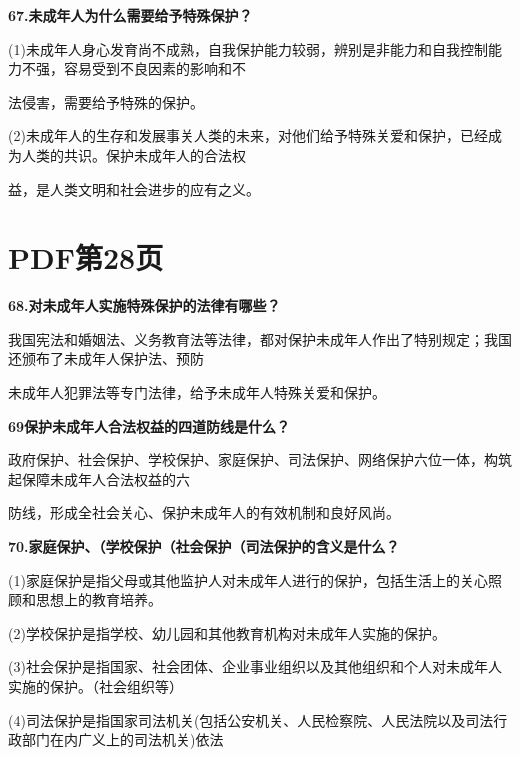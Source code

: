 \documentclass[lang=cn,11pt]{elegantbook}
\begin{document}
\textbf{67.未成年人为什么需要给予特殊保护？}\par

(1)未成年人身心发育尚不成熟，自我保护能力较弱，辨别是非能力和自我控制能力不强，容易受到不良因素的影响和不\par

法侵害，需要给予特殊的保护。\par

(2)未成年人的生存和发展事关人类的未来，对他们给予特殊关爱和保护，已经成为人类的共识。保护未成年人的合法权\par

益，是人类文明和社会进步的应有之义。\par


\section*{PDF第28页}

\textbf{68.对未成年人实施特殊保护的法律有哪些？}\par

我国宪法和婚姻法、义务教育法等法律，都对保护未成年人作出了特别规定；我国还颁布了未成年人保护法、预防\par

未成年人犯罪法等专门法律，给予未成年人特殊关爱和保护。\par

\textbf{69保护未成年人合法权益的四道防线是什么？}\par

政府保护、社会保护、学校保护、家庭保护、司法保护、网络保护六位一体，构筑起保障未成年人合法权益的六\par

防线，形成全社会关心、保护未成年人的有效机制和良好风尚。\par

\textbf{70.家庭保护、（学校保护（社会保护（司法保护的含义是什么？}\par

(1)家庭保护是指父母或其他监护人对未成年人进行的保护，包括生活上的关心照顾和思想上的教育培养。\par

(2)学校保护是指学校、幼儿园和其他教育机构对未成年人实施的保护。\par

(3)社会保护是指国家、社会团体、企业事业组织以及其他组织和个人对未成年人实施的保护。（社会组织等）\par

(4)司法保护是指国家司法机关(包括公安机关、人民检察院、人民法院以及司法行政部门在内广义上的司法机关)依法\par
\end{document}
